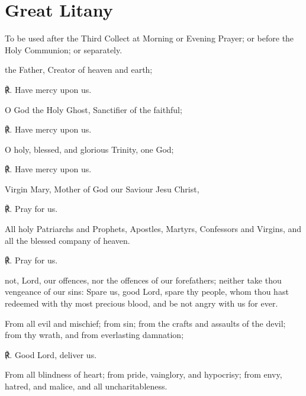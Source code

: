 \label{litany}
\fancyhead[RE,LO]{}
\section{Great Litany}
\begin{secrubric}
	{To be used after the Third Collect at Morning or Evening Prayer; or before the Holy Communion; or separately.}
\end{secrubric}
 the Father, Creator of heaven and earth;\par
   ℟. Have mercy upon us.
\par\noindent
   O God the Holy Ghost, Sanctifier of the faithful;

   ℟. Have mercy upon us.
   \par\noindent
   O holy, blessed, and glorious Trinity, one God;
   
   ℟. Have mercy upon us.
   \par\noindent
   Virgin Mary, Mother of God our Saviour Jesu Christ,\par
℟. Pray for us.\par\noindent
  All holy Patriarchs and Prophets, Apostles, Martyrs, Confessors and Virgins, and all the blessed company of heaven.\par
℟. Pray for us.
  \par\noindent
    not, Lord, our offences, nor the offences of our forefathers; neither take thou vengeance of our sins: Spare us, good Lord, spare thy people, whom thou hast redeemed with thy most precious blood, and be not angry with us for ever.\par  
   \par\noindent
    From all evil and mischief; from sin; from the crafts and assaults of the devil; from thy wrath, and from everlasting damnation;
    
    ℟. Good Lord, deliver us.
    \par\noindent
    From all blindness of heart; from pride, vainglory, and hypocrisy; from envy, hatred, and malice, and all uncharitableness.
    
